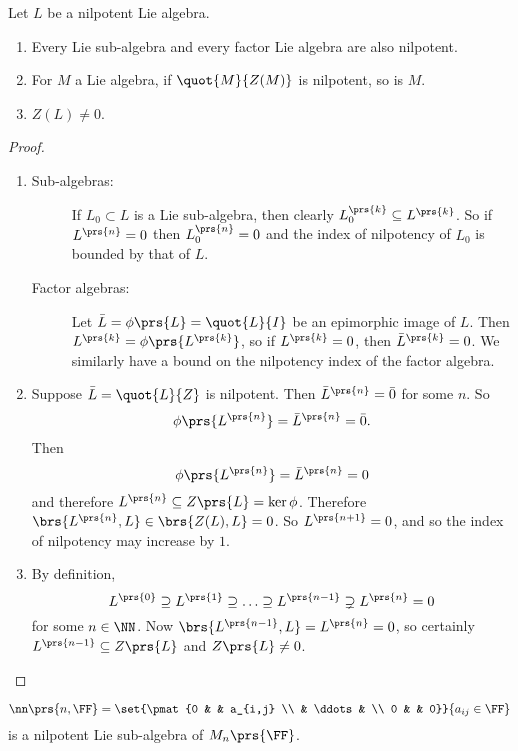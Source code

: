 \documentclass[10pt,a4paper,twoside,openany,hidelinks]{book}
\begin{document}
\begin{proposition}
Let $L$ be a nilpotent Lie algebra.
\begin{enumerate}
\item Every Lie sub-algebra and every factor Lie algebra are also nilpotent.
\item For $M$ a Lie algebra, if $\quot{M}{Z(M)}$ is nilpotent, so is $M$.
\item $Z(L) \neq 0$.
\end{enumerate}
\end{proposition}
\begin{proof}
\begin{enumerate}
\item
\begin{description}
\item[Sub-algebras:]
If $L_0 \subset L$ is a Lie sub-algebra, then clearly $L_0^{\prs{k}} \subseteq L^{\prs{k}}$. So if $L^{\prs{n}} = 0$ then $L_0^{\prs{n}} = 0$ and the index of nilpotency of $L_0$ is bounded by that of $L$.
\item[Factor algebras:]
Let $\bar{L} = \phi\prs{L} = \quot{L}{I}$ be an epimorphic image of $L$. Then $L^{\prs{k}} = \phi\prs{L^{\prs{k}}}$, so if $L^{\prs{k}} = 0$, then $\bar{L}^{\prs{k}} = 0$. We similarly have a bound on the nilpotency index of the factor algebra.
\end{description}
\item Suppose $\bar{L} = \quot{L}{Z}$ is nilpotent. Then $\bar{L}^{\prs{n}} = \bar{0}$ for some $n$. So \[\phi\prs{L^{\prs{n}}} = \bar{L}^{\prs{n}} = \bar{0}\text{.}\] Then \[\phi\prs{L^{\prs{n}}} = \bar{L}^{\prs{n}} = 0\] and therefore $L^{\prs{n}} \subseteq Z\prs{L} = \ker \phi$. Therefore $\brs{L^{\prs{n}},L} \in \brs{Z(L),L} = 0$. So $L^{\prs{n+1}} = 0$, and so the index of nilpotency may increase by $1$.
\item By definition, \[L^{\prs{0}} \supseteq L^{\prs{1}} \supseteq \ldots \supseteq L^{\prs{n-1}} \supsetneq L^{\prs{n}} = 0\]
for some $n \in \NN$. Now $\brs{L^{\prs{n-1}}, L} = L^{\prs{n}} = 0$, so certainly $L^{\prs{n-1}} \subseteq Z\prs{L}$ and $Z\prs{L} \neq 0$.
\end{enumerate}
\end{proof}
\begin{exercise}
\[\nn\prs{n,\FF} = \set{\pmat{0 & & a_{i,j} \\ & \ddots & \\ 0 & & 0}}{a_{ij} \in \FF}\] is a nilpotent Lie sub-algebra of $M_n\prs{\FF}$.
\end{exercise}
\end{document}

